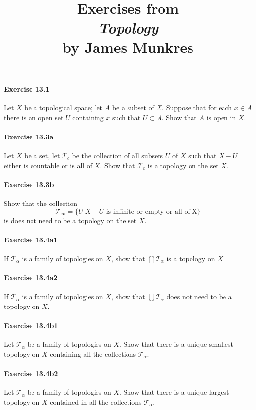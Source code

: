 \documentclass{article}
\title{\textbf{
Exercises from \\
\textit{Topology} \\
by James Munkres
}}
\date{}
\begin{document}
\maketitle

\paragraph{Exercise 13.1} Let $X$ be a topological space; let $A$ be a subset of $X$. Suppose that for each $x \in A$ there is an open set $U$ containing $x$ such that $U \subset A$. Show that $A$ is open in $X$.

\paragraph{Exercise 13.3a} Let $X$ be a set, let $\mathcal{T}_c$ be the collection of all subsets $U$ of $X$ such that $X - U$ either is countable or is all of $X$. Show that $\mathcal{T}_c$ is a topology on the set $X$.

\paragraph{Exercise 13.3b} Show that the collection $$\mathcal{T}_\infty = \{U | X - U \text{ is infinite or empty or all of X}\}$$ is does not need to be a topology on the set $X$.

\paragraph{Exercise 13.4a1} If $\mathcal{T}_\alpha$ is a family of topologies on $X$, show that $\bigcap \mathcal{T}_\alpha$ is a topology on $X$.

\paragraph{Exercise 13.4a2} If $\mathcal{T}_\alpha$ is a family of topologies on $X$, show that $\bigcup \mathcal{T}_\alpha$ does not need to be a topology on $X$.

\paragraph{Exercise 13.4b1} Let $\mathcal{T}_\alpha$ be a family of topologies on $X$. Show that there is a unique smallest topology on $X$ containing all the collections $\mathcal{T}_\alpha$.

\paragraph{Exercise 13.4b2} Let $\mathcal{T}_\alpha$ be a family of topologies on $X$. Show that there is a unique largest topology on $X$ contained in all the collections $\mathcal{T}_\alpha$.
\end{document}
